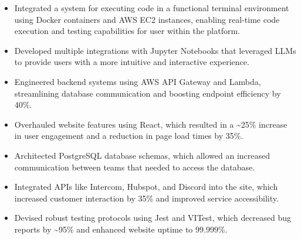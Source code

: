 \documentclass[10pt,a4paper,ragged2e,withhyper]{altacv}
\begin{document}
    \makecvheader
    \begin{paracol}{2}
            \begin{itemize}
                \item Integrated a system for executing code in a functional terminal environment using Docker containers and AWS EC2 instances, enabling real-time code execution and testing capabilities for user within the platform.
                \item Developed multiple integrations with Jupyter Notebooks that leveraged LLMs to provide users with a more intuitive and interactive experience.
                \item Engineered backend systems using AWS API Gateway and Lambda, streamlining database communication and boosting endpoint efficiency by 40\%.
                \item Overhauled website features using React, which resulted in a \textasciitilde25\% increase in user engagement and a reduction in page load times by 35\%.
                \item Architected PostgreSQL database schemas, which allowed an increased communication between teams that needed to access the database.
                \item Integrated APIs like Intercom, Hubspot, and Discord into the site, which increased customer interaction by 35\% and improved service accessibility.
                \item Devised robust testing protocols using Jest and VITest, which decreased bug reports by \textasciitilde95\% and enhanced website uptime to 99.999\%.
            \end{itemize}
            \customdivider
            

\end{paracol}
\end{document}
